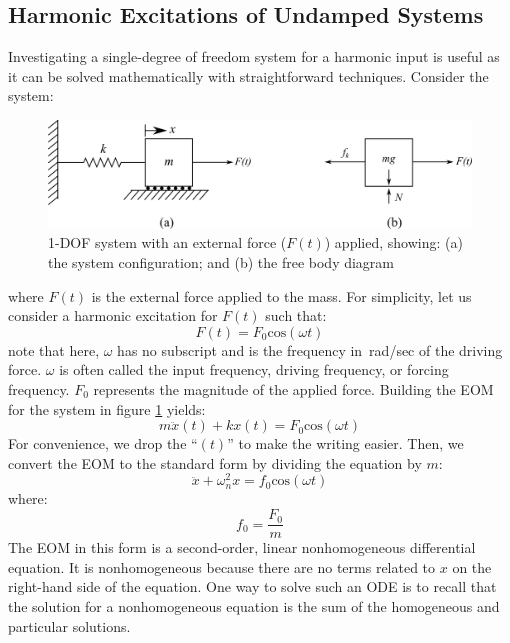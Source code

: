 \documentclass[12pt,letter]{article}
\begin{document}
\subsection{Harmonic Excitations of Undamped Systems}


	Investigating a single-degree of freedom system for a harmonic input is useful as it can be solved mathematically with straightforward techniques. Consider the system:
	\begin{figure}[H]
		\centering
		\includegraphics[]{../figures/1-DOF-spring_mass_horizontal_forced_FBD.png}
		\caption{1-DOF system with an external force ($F(t)$) applied, showing: (a) the system configuration; and (b) the free body diagram}
		\label{fig:1-DOF-spring_mass_horizontal_forced_FBD}
	\end{figure}	
	\noindent where $F(t)$ is the external force applied to the mass. For simplicity, let us consider a harmonic excitation for $F(t)$ such that:
	\begin{equation}
		F(t) = F_0\text{cos}(\omega t)
	\end{equation}							
	note that here, $\omega$ has no subscript and is the frequency in~rad/sec of the driving force. $\omega$ is often called the input frequency, driving frequency, or forcing frequency. $F_0$ represents the magnitude of the applied force.  Building the EOM for the system in figure \ref{fig:1-DOF-spring_mass_horizontal_forced_FBD} yields:
	\begin{equation}
		m \ddot{x}(t)+kx(t) = F_0\text{cos}(\omega t)
	\end{equation}			
	For convenience, we drop the ``$(t)$'' to make the writing easier. Then, we convert the EOM to the standard form by dividing the equation by $m$:					
	\begin{equation}
		\ddot{x}+\omega_n^2x = f_0\text{cos}(\omega t)
	\end{equation}					
	where:
	\begin{equation}
		f_0 = \frac{F_0}{m}
	\end{equation}	
	The EOM in this form is a second-order, linear nonhomogeneous differential equation. It is nonhomogeneous because there are no terms related to $x$ on the right-hand side of the equation. One way to solve such an ODE is to recall that the solution for a nonhomogeneous equation is the sum of the homogeneous and particular solutions. 
\end{document}
